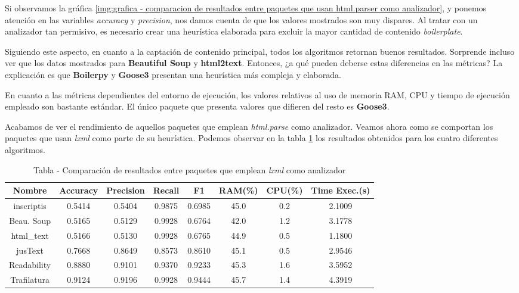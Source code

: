 Si observamos la gráfica \ref{img:grafica - comparacion de resultados entre paquetes que usan html.parser como analizador},
y ponemos atención en las variables \emph{accuracy} y \emph{precision}, nos damos cuenta de que los valores
mostrados son muy dispares. Al tratar con un analizador tan permisivo, es necesario crear una heurística
elaborada para excluir la mayor cantidad de contenido \emph{boilerplate}.

Siguiendo este aspecto, en cuanto a la captación de contenido principal, todos los algoritmos retornan
buenos resultados. Sorprende incluso ver que los datos mostrados para \textbf{Beautiful Soup} y 
\textbf{html2text}. Entonces, ¿a qué pueden deberse estas diferencias en las métricas? La explicación es
que \textbf{Boilerpy} y \textbf{Goose3} presentan una heurística más compleja y elaborada.

En cuanto a las métricas dependientes del entorno de ejecución, los valores relativos al uso de memoria
RAM, CPU y tiempo de ejecución empleado son bastante estándar. El único paquete que presenta valores que
difieren del resto es \textbf{Goose3}.

Acabamos de ver el rendimiento de aquellos paquetes que emplean \emph{html.parse} como analizador. Veamos
ahora como se comportan los paquetes que usan \emph{lxml} como parte de su heurística. Podemos observar en 
la tabla \ref{tab:tabla - comparacion de resultados entre paquetes que emplean lxml como analizador} los 
resultados obtenidos para los cuatro diferentes algoritmos.

\begin{table}[h]
    \begin{center}
      \begin{tabular}{| c | c | c | c | c | c | c | c |} \hline 
       \textbf{Nombre} & \textbf{Accuracy} & \textbf{Precision}  & \textbf{Recall} & \textbf{F1} & \textbf{RAM(\%)} & \textbf{CPU(\%)} & \textbf{Time Exec.(s)} \\ \hline
       inscriptis & 0.5414 & 0.5404 & 0.9875 & 0.6985 & 45.0 & 0.2 & 2.1009 \\ \hline
       Beau. Soup & 0.5165 & 0.5129 & 0.9928 & 0.6764 & 42.0 & 1.2 & 3.1778 \\ \hline
       html\_text & 0.5166 & 0.5130 & 0.9928 & 0.6765 & 44.9 & 0.5 & 1.1800 \\ \hline
       jusText & 0.7668 & 0.8649 & 0.8573 & 0.8610 & 45.1 & 0.5 & 2.9546 \\ \hline
       Readability & 0.8880 & 0.9101 & 0.9370 & 0.9233 & 45.3 & 1.6 & 3.5952 \\ \hline
       Trafilatura & 0.9124 & 0.9196 & 0.9928 & 0.9444 & 45.7 & 1.4 & 4.3919 \\ \hline
      \end{tabular}
      \caption{Tabla - Comparación de resultados entre paquetes que emplean \emph{lxml} como analizador}
      \label{tab:tabla - comparacion de resultados entre paquetes que emplean lxml como analizador}
    \end{center}
\end{table}

